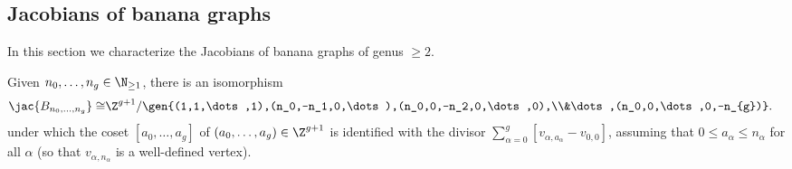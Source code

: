 \subsection{Jacobians of banana graphs}
In this section we characterize the Jacobians of banana graphs of genus $\geq 2$.

\begin{prop}\label{prop-JacBanana}
    Given $n_0,\dots,n_{g} \in \N_{\geq 1}$, there is an isomorphism
    \begin{align*}
        \jac{B_{n_0,\dots,n_g}}\cong &\Z^{g+1}/\gen{(1,1,\dots,1),(n_0,-n_1,0,\dots),(n_0,0,-n_2,0,\dots,0),\\&\dots,(n_0,0,\dots,0,-n_{g})}.
    \end{align*}
    under which the coset $[a_0, \ldots , a_g]$ of $(a_0, \ldots, a_g) \in \Z^{g+1}$ is identified with the divisor $\sum_{\alpha=0}^g [ v_{\alpha,a_\alpha} - v_{0,0} ]$, assuming that $0 \leq a_\alpha \leq n_\alpha$ for all $\alpha$ (so that $v_{\alpha,n_\alpha}$ is a well-defined vertex).
\end{prop}


